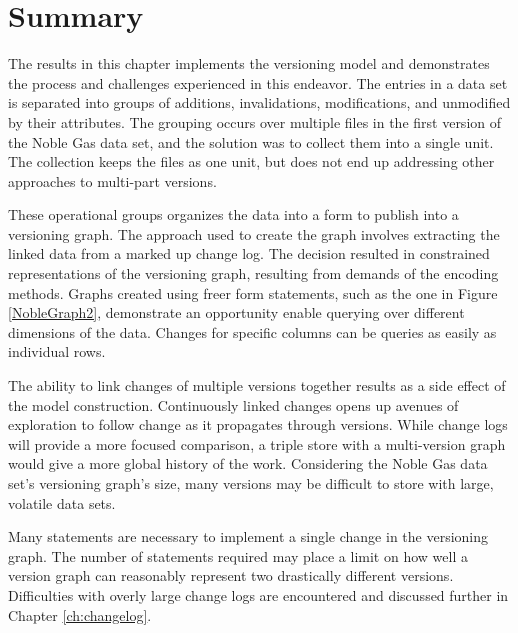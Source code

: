 \section{Summary}

The results in this chapter implements the versioning model and demonstrates the process and challenges experienced in this endeavor.
The entries in a data set is separated into groups of additions, invalidations, modifications, and unmodified by their attributes.
The grouping occurs over multiple files in the first version of the Noble Gas data set, and the solution was to collect them into a single unit.
The collection keeps the files as one unit, but does not end up addressing other approaches to multi-part versions.

These operational groups organizes the data into a form to publish into a versioning graph.
The approach used to create the graph involves extracting the linked data from a marked up change log.
The decision resulted in constrained representations of the versioning graph, resulting from demands of the encoding methods.
Graphs created using freer form statements, such as the one in Figure \ref{NobleGraph2}, demonstrate an opportunity enable querying over different dimensions of the data.
Changes for specific columns can be queries as easily as individual rows.

The ability to link changes of multiple versions together results as a side effect of the model construction.
Continuously linked changes opens up avenues of exploration to follow change as it propagates through versions.
While change logs will provide a more focused comparison, a triple store with a multi-version graph would give a more global history of the work.
Considering the Noble Gas data set's versioning graph's size, many versions may be difficult to store with large, volatile data sets.

Many statements are necessary to implement a single change in the versioning graph.
The number of statements required may place a limit on how well a version graph can reasonably represent two drastically different versions.
Difficulties with overly large change logs are encountered and discussed further in Chapter \ref{ch:changelog}.
